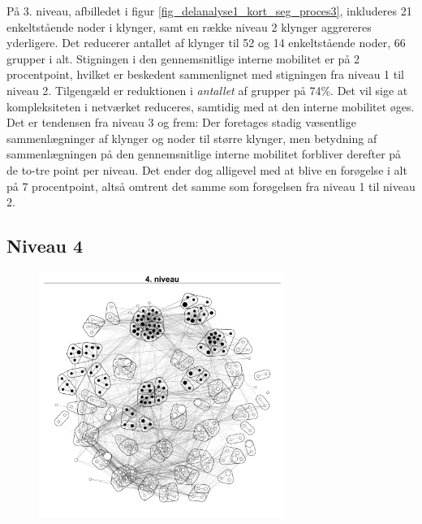 På 3. niveau, afbilledet i figur \ref{fig_delanalyse1_kort_seg_proces3}, inkluderes 21 enkeltstående noder i klynger, samt en række niveau 2 klynger aggrereres yderligere. Det reducerer antallet af klynger til 52 og 14 enkeltstående noder, 66 grupper i alt. Stigningen i den gennemsnitlige interne mobilitet er på 2 procentpoint, hvilket er beskedent sammenlignet med stigningen fra niveau 1 til niveau 2. Tilgengæld er reduktionen i \emph{antallet} af grupper på 74\%. Det vil sige at kompleksiteten i netværket reduceres, samtidig med at den interne mobilitet øges. Det er tendensen fra niveau 3 og frem: Der foretages stadig væsentlige sammenlægninger af klynger og noder til større klynger, men betydning af sammenlægningen på den gennemsnitlige interne mobilitet forbliver derefter på de to-tre point per niveau. Det ender dog alligevel med at blive en forøgelse i alt på 7 procentpoint, altså omtrent det samme som forøgelsen fra niveau 1 til niveau 2. 



\newpage \subsection{Niveau 4}

\begin{figure}
  \vspace{-20pt}
  \begin{center}
   \caption{}
   \label{fig_delanalyse1_kort_seg_proces4}
    \includegraphics[width=8cm]{fig/netvaerkskort/kort_seg_proces4.pdf}
  \end{center}
  \label{fig_delanalyse1_kort_seg_proces4}
  \vspace{-20pt}
\end{figure}

